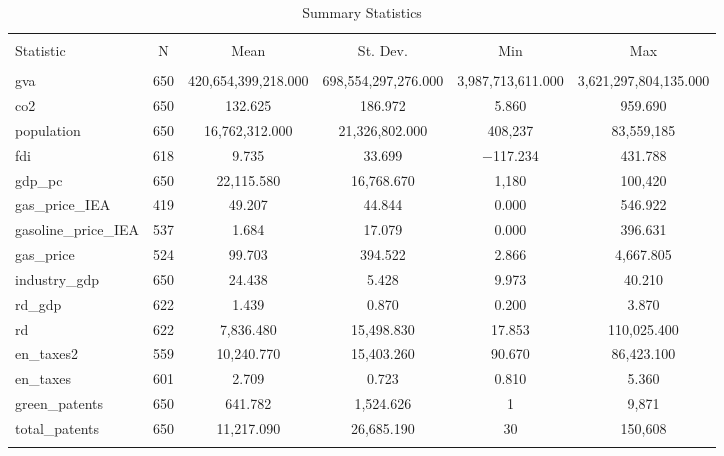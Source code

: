 
\begin{table}[!htbp] \centering 
  \caption{Summary Statistics} 
  \label{tab:sumstats} 
\begin{tabular}{@{\extracolsep{5pt}}lccccc} 
\\[-1.8ex]\hline 
\hline \\[-1.8ex] 
Statistic & \multicolumn{1}{c}{N} & \multicolumn{1}{c}{Mean} & \multicolumn{1}{c}{St. Dev.} & \multicolumn{1}{c}{Min} & \multicolumn{1}{c}{Max} \\ 
\hline \\[-1.8ex] 
gva & 650 & 420,654,399,218.000 & 698,554,297,276.000 & 3,987,713,611.000 & 3,621,297,804,135.000 \\ 
co2 & 650 & 132.625 & 186.972 & 5.860 & 959.690 \\ 
population & 650 & 16,762,312.000 & 21,326,802.000 & 408,237 & 83,559,185 \\ 
fdi & 618 & 9.735 & 33.699 & $-$117.234 & 431.788 \\ 
gdp\_pc & 650 & 22,115.580 & 16,768.670 & 1,180 & 100,420 \\ 
gas\_price\_IEA & 419 & 49.207 & 44.844 & 0.000 & 546.922 \\ 
gasoline\_price\_IEA & 537 & 1.684 & 17.079 & 0.000 & 396.631 \\ 
gas\_price & 524 & 99.703 & 394.522 & 2.866 & 4,667.805 \\ 
industry\_gdp & 650 & 24.438 & 5.428 & 9.973 & 40.210 \\ 
rd\_gdp & 622 & 1.439 & 0.870 & 0.200 & 3.870 \\ 
rd & 622 & 7,836.480 & 15,498.830 & 17.853 & 110,025.400 \\ 
en\_taxes2 & 559 & 10,240.770 & 15,403.260 & 90.670 & 86,423.100 \\ 
en\_taxes & 601 & 2.709 & 0.723 & 0.810 & 5.360 \\ 
green\_patents & 650 & 641.782 & 1,524.626 & 1 & 9,871 \\ 
total\_patents & 650 & 11,217.090 & 26,685.190 & 30 & 150,608 \\ 
\hline \\[-1.8ex] 
\end{tabular} 
\end{table} 
